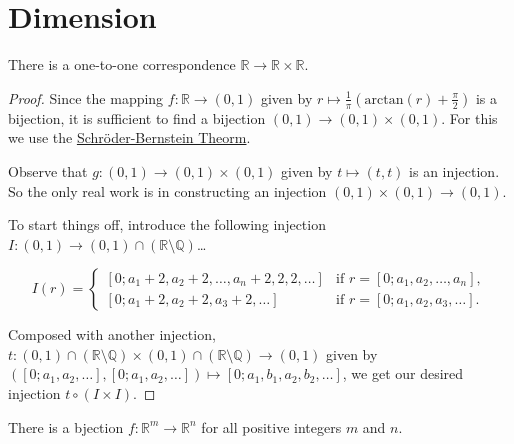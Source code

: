 \newpage

\section{Dimension}\label{dimension}

\begin{theorem}
There is a one-to-one correspondence $\mathbb{R} \rightarrow \mathbb{R} \times \mathbb{R}$.
\end{theorem}

\begin{proof}
Since the mapping $f: \mathbb{R} \rightarrow (0,1)$ given by $ r \mapsto \frac{1}{\pi}(\textrm{arctan}(r) + \frac{\pi}{2})$ is a bijection, it is sufficient
to find a bijection $(0,1) \rightarrow (0,1) \times (0,1)$. For this we use the \hyperref[schroderbernsteinthm]{Schr\"oder-Bernstein Theorm}.

Observe that $g:(0,1) \rightarrow (0,1) \times (0,1)$ given by $t \mapsto (t,t)$ is an injection. So the only real work is in constructing an injection $(0,1) \times (0,1) \rightarrow (0,1)$.

To start things off, introduce the following injection $I :(0,1) \rightarrow (0,1)\cap(\mathbb{R} \setminus \mathbb{Q})$\dots

\[
I(r) = \begin{cases}
			[0;a_1+2,a_2+2,\dots,a_n+2,2,2,\dots] & \textrm{if } r=[0;a_1,a_2,\dots,a_n],\\
			[0;a_1+2,a_2+2,a_3+2,\dots] & \textrm{if } r=[0;a_1,a_2,a_3,\dots].
	   \end{cases}
\]

\noindent Composed with another injection, $t:(0,1)\cap(\mathbb{R} \setminus \mathbb{Q}) \times (0,1)\cap(\mathbb{R} \setminus \mathbb{Q}) \rightarrow (0,1)$ given by $([0;a_1,a_2,\dots],[0;a_1,a_2,\dots]) \mapsto [0;a_1,b_1,a_2,b_2,\dots]$, we get
our desired injection $t \circ (I \times I).$
\end{proof}

\begin{corollary}
There is a bjection $f : \mathbb{R}^m \rightarrow \mathbb{R}^n$ for all positive integers $m$ and $n$. 
\end{corollary}
